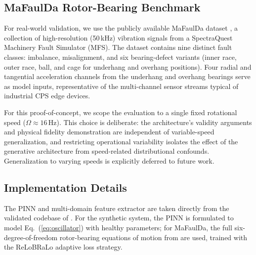 \documentclass[conference]{IEEEtran}
\begin{document}
\subsection{MaFaulDa Rotor-Bearing Benchmark}


For real-world validation, we use the publicly available MaFaulDa dataset %
\cite{spotorno2026linking}, a collection of high-resolution (50\,kHz) vibration signals from a SpectraQuest Machinery Fault Simulator (MFS). The dataset contains nine distinct fault classes: imbalance, misalignment, and six bearing-defect variants (inner race, outer race, ball, and cage for underhang and overhang positions). Four radial and tangential acceleration channels from the underhang and overhang bearings serve as model inputs, representative of the multi-channel sensor streams typical of industrial CPS edge devices.

For this proof-of-concept, we scope the evaluation to a single fixed rotational speed ($\Omega\approx16$\,Hz). %
This choice is deliberate: the architecture's validity arguments and physical fidelity demonstration are independent of variable-speed generalization, and restricting operational variability isolates the effect of the generative architecture from speed-related distributional confounds. Generalization to varying speeds is explicitly deferred to future work.

\subsection{Implementation Details}

The PINN and multi-domain feature extractor are taken directly from the validated codebase of \cite{spotorno2026linking}. For the synthetic system, the PINN is formulated to model Eq.~(\ref{eq:oscillator}) with healthy parameters; for MaFaulDa, the full six-degree-of-freedom rotor-bearing equations of motion from \cite{spotorno2026linking} are used, trained with the ReLoBRaLo adaptive loss strategy.
\end{document}
